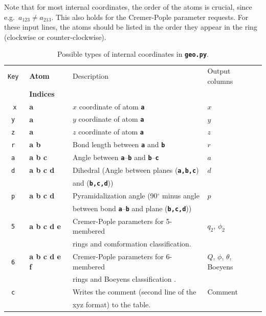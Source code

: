 \documentclass[a4paper,11pt,DIV=15,openany,twoside=false]{scrbook}
\newcommand{\ttt}[1]{\textbf{\texttt{#1}}}
\begin{document}
Note that for most internal coordinates, the order of the atoms is crucial, since e.g.\ $a_{123}\neq a_{213}$. This also holds for the Cremer-Pople parameter requests. For these input lines, the atoms should be listed in the order they appear in the ring (clockwise or counter-clockwise).

\begin{table}[h]
  \centering
  \caption{Possible types of internal coordinates in \ttt{geo.py}. }
  \label{tab:Geo_input}
  \begin{tabular}{>{\tt}c>{\bfseries\ttfamily}lll}
    \toprule
    \rmfamily Key         &\normalfont\rmfamily Atom      &Description    &Output columns\\
                          &\normalfont\rmfamily Indices   &               &\\
    \midrule
    x   &a              &$x$ coordinate of atom \ttt{a}         &$x$\\
    y   &a              &$y$ coordinate of atom \ttt{a}         &$y$\\
    z   &a              &$z$ coordinate of atom \ttt{a}         &$z$\\
    r   &a b            &Bond length between \ttt{a} and \ttt{b}        &$r$\\
    a   &a b c          &Angle between \ttt{a}--\ttt{b} and \ttt{b}--\ttt{c}         &$a$\\
    d   &a b c d        &Dihedral (Angle between planes (\ttt{a,b,c})    &$d$\\
                       &&and (\ttt{b,c,d}))&\\
    p   &a b c d        &Pyramidalization angle (90$^\circ$ minus angle    &$p$\\
                       &&between bond \ttt{a}--\ttt{b} and plane (\ttt{b,c,d}))&\\
    5   &a b c d e      &Cremer-Pople parameters for 5-membered&$q_2$, $\phi_2$\\
                       &&rings \cite{Cremer1975JACS} and comformation classification.&\\
    6   &a b c d e f    &Cremer-Pople parameters for 6-membered&$Q$, $\phi$, $\theta$, Boeyens\\
                       &&rings \cite{Cremer1975JACS} and Boeyens classification \cite{Boeyens1976JCMS}.&\\
    c   &               &Writes the comment (second line of the &Comment\\
                       &&xyz format) to the table.&\\
    \bottomrule
  \end{tabular}
\end{table}
\end{document}
